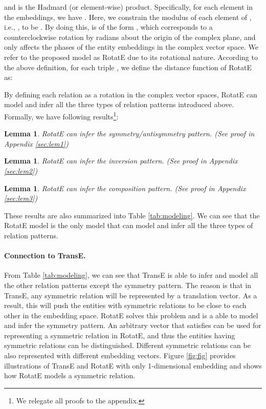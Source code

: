 \documentclass{article} \usepackage{iclr2019_conference,times}
\def\method{RotatE}
\newtheorem{lemma}[theorem]{Lemma}
\begin{document}
and  is the Hadmard (or element-wise) product. Specifically, for each element in the embeddings, we have .
Here, we constrain the modulus of each element of , i.e., , to be . By doing this,  is of the form , which corresponds to a counterclockwise rotation by  radians about the origin of the complex plane, and only affects the phases of the entity embeddings in the complex vector space.
We refer to the proposed model as \method{} due to its rotational nature. According to the above definition, for each triple , we define the distance function of \method{} as:


By defining each relation as a rotation in the complex vector spaces, \method{} can model and infer all the three types of relation patterns introduced above. Formally, we have following results\footnote{We relegate all proofs to the appendix.}:
\begin{lemma}\label{lem1}
\method{} can infer the symmetry/antisymmetry pattern. (See proof in Appendix \ref{sec:lem1})
\end{lemma}
\begin{lemma}\label{lem2}
\method{} can infer the inversion pattern. (See proof in Appendix \ref{sec:lem2})
\end{lemma}
\begin{lemma}\label{lem3}
\method{} can infer the composition pattern. (See proof in Appendix \ref{sec:lem3})
\end{lemma}
These results are also summarized into Table \ref{tab:modeling}.
We can see that the \method{} model is  the only model that can model and infer all the three types of relation patterns.

\paragraph{Connection to TransE.} From Table \ref{tab:modeling}, we can see that TransE is able to infer and model all the other relation patterns except the symmetry pattern. The reason is that in TransE, any symmetric relation will be represented by a  translation vector. As a result, this will push the entities with symmetric relations to be close to each other in the embedding space. \method{} solves this problem and is a able to model and infer the symmetry pattern. An arbitrary vector  that satisfies  can be used for representing a symmetric relation in \method{}, and thus the entities having symmetric relations can be distinguished. Different symmetric relations can be also represented with different embedding vectors.  Figure \ref{fig:fig} provides illustrations of TransE and \method{} with only 1-dimensional embedding and shows how \method{} models a symmetric relation.
\end{document}
